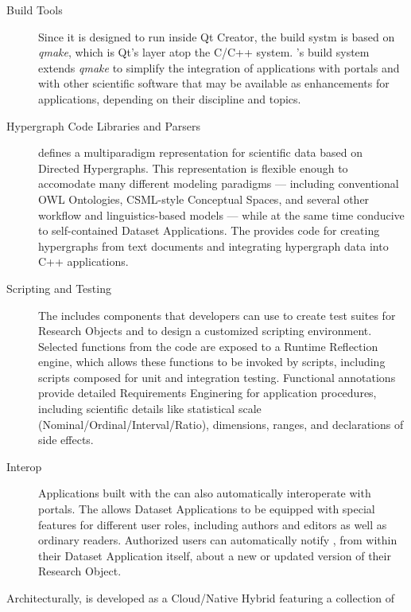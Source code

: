 \documentclass[10pt,letterpaper]{article}
\begin{document}
\begin{description}
\item[Build Tools]  Since it is designed to run 
inside Qt Creator, the {\RAK} build systm 
is based on \textit{qmake}, which is Qt's 
layer atop the C/C++  system.  
{\lMOSAIC}'s build system extends \textit{qmake} to 
simplify the integration of {\RAK} applications 
with {\MOSAIC} portals and with other scientific 
software that may be available as enhancements 
for {\RAK} applications, depending on their 
discipline and topics.

\item[Hypergraph Code Libraries and Parsers]  
{\lMOSAIC} defines a multiparadigm representation for 
scientific data based on Directed Hypergraphs.  
This representation is flexible enough to 
accomodate many different modeling 
paradigms --- including 
conventional OWL Ontologies, 
CSML-style Conceptual Spaces, and 
several other workflow and linguistics-based models 
--- while at the same time conducive to self-contained 
Dataset Applications.  The {\MOSAIC} {\SDK} provides 
code for creating hypergraphs from text documents and 
integrating hypergraph data into C++ applications.

\item[Scripting and Testing]  The {\MOSAIC} {\SDK} includes 
components that developers can use to create 
test suites for Research Objects and to design a 
customized scripting environment.  Selected 
functions from the {\RO} code are exposed 
to a Runtime Reflection engine, which allows these 
functions to be invoked by scripts, including 
scripts composed for unit and integration testing.  
Functional annotations provide detailed Requirements 
Enginering for application procedures, including scientific 
details like statistical scale (Nominal/Ordinal/Interval/Ratio),
dimensions, ranges, and declarations of side effects.

\item[{\lMOSAIC} Interop]  Applications built 
with the {\MOSAIC} {\SDK} can also automatically 
interoperate with {\MOSAIC} portals.  The {\SDK} 
allows Dataset Applications to be equipped 
with special features for different user roles, 
including authors and editors as well as ordinary readers.  
Authorized 
users can automatically notify {\MOSAIC}, 
from within their Dataset Application itself, about 
a new or updated version of their Research Object.
\end{description}
\p{}
Architecturally, {\MOSAIC} is developed as a 
Cloud/Native Hybrid featuring a collection of 
\end{document}
